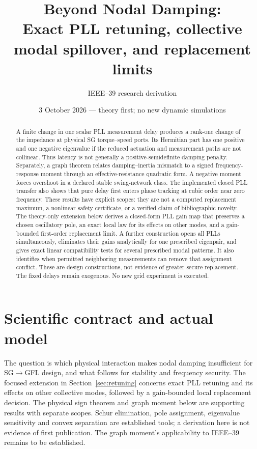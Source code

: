 \documentclass[11pt]{article}
\title{Beyond Nodal Damping:\\Exact PLL retuning, collective modal spillover, and replacement limits}
\author{IEEE--39 research derivation}
\date{3 October 2026 --- theory first; no new dynamic simulations}
\begin{document}
\maketitle
\begin{abstract}
A finite change in one scalar PLL measurement delay produces a rank-one
change of the impedance at physical SG torque--speed ports. Its Hermitian
part has one positive and one negative eigenvalue if the reduced actuation
and measurement paths are not collinear. Thus latency is not generally a
positive-semidefinite damping penalty. Separately, a graph theorem relates
damping--inertia mismatch to a signed frequency-response moment through an
effective-resistance quadratic form. A negative moment forces overshoot in
a declared stable swing-network class. The implemented closed PLL transfer
also shows that pure delay first enters phase tracking at cubic order near
zero frequency. These results have explicit scopes: they are not a computed
replacement maximum, a nonlinear safety certificate, or a verified claim of
bibliographic novelty. The theory-only extension below derives a closed-form
PLL gain map that preserves a chosen oscillatory pole, an exact local law
for its effects on other modes, and a gain-bounded first-order replacement
limit. A further construction opens all PLLs simultaneously, eliminates
their gains analytically for one prescribed eigenpair, and gives exact
linear compatibility tests for several prescribed modal patterns.
It also identifies when permitted neighboring measurements can remove
that assignment conflict. These are design constructions, not evidence
of greater secure replacement. The fixed delays remain exogenous.
No new grid experiment is executed.
\end{abstract}

\section{Scientific contract and actual model}
The question is which physical interaction makes nodal damping insufficient
for SG$\to$GFL design, and what follows for stability and frequency security.
The focused extension in Section~\ref{sec:retuning} concerns exact
PLL retuning and its effects on other collective modes, followed by
a gain-bounded local replacement decision. The physical sign theorem
and graph moment below are supporting results with separate scopes.
Schur elimination, pole assignment, eigenvalue sensitivity and convex
separation are established tools; a derivation here is not evidence
of first publication. The graph moment's applicability to IEEE--39
remains to be established.
\end{document}
